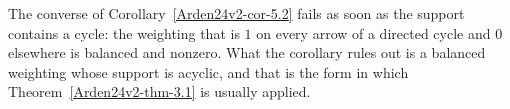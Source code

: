 \begin{remark}\label{Arden24v2-rem-5.3}
\label{Arden24v2-rem:local}
The converse of Corollary~\ref{Arden24v2-cor-5.2} fails as soon as the support contains a cycle: the weighting that is $1$ on every arrow of a directed cycle and $0$ elsewhere is balanced and nonzero. What the corollary rules out is a balanced weighting whose support is acyclic, and that is the form in which Theorem~\ref{Arden24v2-thm-3.1} is usually applied.
\end{remark}